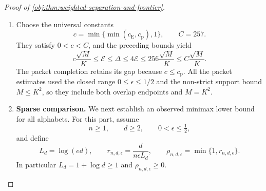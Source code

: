 \begin{proof}[Proof of \cref{obj:thm:weighted-separation-and-frontier}]
\begin{enumerate}
Set
\[
N_{\mathrm{up}}=\lfloor K/2\rfloor+1,
\qquad
T_{\mathrm{up}}(\omega)
=\int_{-\pi}^{\pi}
f_{M,\epsilon}(\omega+\upsilon)
J_{N_{\mathrm{up}}}^{\mathrm J}(\upsilon)\,d\upsilon.
\]
Convolution with the even Jackson kernel makes \(T_{\mathrm{up}}\) an even trigonometric polynomial of degree at most
\(2(N_{\mathrm{up}}-1)\le K\). Positivity, normalization, and the first kernel moment give
\[
|f_{M,\epsilon}(\omega)-T_{\mathrm{up}}(\omega)|
\le
\sqrt M\int_{-\pi}^{\pi}
|\upsilon|J_{N_{\mathrm{up}}}^{\mathrm J}(\upsilon)\,d\upsilon
\le\frac{32\sqrt M}{N_{\mathrm{up}}}.
\]
Writing its cosine modes as Chebyshev polynomials supplies a real polynomial \(Q_{\mathrm{up}}\) such that
\[
T_{\mathrm{up}}(\omega)=Q_{\mathrm{up}}(\cos\omega),
\qquad
\deg Q_{\mathrm{up}}\le2(N_{\mathrm{up}}-1).
\]
Define
\[
P_{\mathrm{up}}(z)
=\epsilon(z-1)+Q_{\mathrm{up}}(2z/M-1).
\]
Then \(\deg P_{\mathrm{up}}\le K\), and every \(z\in[0,M]\) can be written as
\(z_M(\omega)\). Since \(K\le2N_{\mathrm{up}}\),
\[
|\phi_\epsilon(z)-P_{\mathrm{up}}(z)|
\le\frac{32\sqrt M}{N_{\mathrm{up}}}
\le\frac{64\sqrt M}{K}.
\]
Division by \(1+z\ge1\), followed by the polynomial infimum, proves
\[
\mathcal E\le\frac{64\sqrt M}{K}.
\]

\item
Choose the universal constants
\[
c=\min\{\min(c_{\mathrm E},c_{\mathrm p}),1\},
\qquad
C=257.
\]
They satisfy \(0<c<C\), and the preceding bounds yield
\[
c\frac{\sqrt M}{K}
\le\mathcal E
\le\Delta
\le4\mathcal E
\le256\frac{\sqrt M}{K}
\le C\frac{\sqrt M}{K}.
\]
The packet completion retains its gap because \(c\le c_{\mathrm p}\).
All the packet estimates used the closed range
\(0\le\epsilon\le1/2\) and the non-strict support bound \(M\le K^2\), so they include both overlap endpoints and \(M=K^2\).

\item
\textbf{Sparse comparison.}\quad
We next establish an observed minimax lower bound for all alphabets. For this part, assume
\[
n\ge1,\qquad d\ge2,\qquad 0<\epsilon\le\tfrac12,
\]
and define
\[
L_d=\log(ed),
\qquad
r_{n,d,\epsilon}=\frac{d}{n\epsilon L_d},
\qquad
\rho_{n,d,\epsilon}=\min\{1,r_{n,d,\epsilon}\}.
\]
In particular \(L_d=1+\log d\ge1\) and \(\rho_{n,d,\epsilon}\ge0\).


\end{enumerate}
\end{proof}
